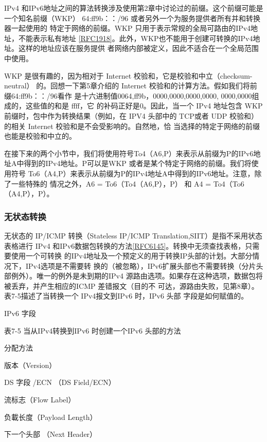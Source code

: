 IPv4 和IPv6地址之间的算法转换涉及使用第2章中讨论过的前缀。这个前缀可能是
一个知名前缀（WKP） 64:ff9b：：/96 或者另外一个为服务提供者所有并和转换器一起使用的
特定于网络的前缀。WKP 只用于表示常规的全局可路由的IPv4地址，不能表示私有地址
\href{https://www.rfc-editor.org/rfc/rfc1918}{[RFC1918]}。此外，WKP也不能用于创建可转换的IPv4地址。这样的地址应该在服务提供
者网络内部被定义，因此不适合在一个全局范围中使用。

WKP 是很有趣的，因为相对于 Internet 校验和，它是校验和中立（checksum-neutral）
的。回想一下第5章介绍的 Internet 校验和的计算方法。假如我们将前缀64:ff9b：：/96看作
是十六进制值0064,ff9b，0000,0000,0000,0000, 0000,0000组成的，这些值的和是 ffff，它
的补码正好是0。因此，当一个 IPv4 地址包含 WKP 前缀时，包中作为转换结果（例如，在
IPV4 头部中的 TCP或者 UDP 校验和）的相关 Internet 校验和是不会受影响的。自然地，恰
当选择的特定于网络的前缀也能是校验和中立的。

在接下来的两个小节中，我们将使用符号To4（A6,P）来表示从前缀为P的IPv6地
址A中得到的IPv4地址。P可以是WKP 或者是某个特定于网络的前缀。我们将使用符号
To6（A4,P）来表示从前缀为P的IPv4地址A中得到的IPv6地址。注意，除了一些特殊的
情况之外，A6 = To6（To4（A6,P），P） 和 A4 = To4（To6（A4,P），P）。

\subsubsection{无状态转换}

无状态的 IP/ICMP 转换（Stateless IP/ICMP Translation,SIIT）是指不采用状态表格进行
IPv4 和IPv6数据包转换的方法\href{https://www.rfc-editor.org/rfc/rfc6145}{[RFC6145]}。转换中无须查找表格，只需要使用一个可转换
的IPv4地址及一个预定义的用于转换IP头部的计划。大部分情况下，IPv4选项是不需要转
换的（被忽略），IPv6扩展头部也不需要转换（分片头部例外）。唯一的例外是未到期的IPv4
源路由选项。如果存在这种选项，数据包将被丢弃，并产生相应的ICMP 差错报文（目的不
可达，源路由失败，见第8章）。表7-5描述了当转换一个 IPv4报文到IPv6 时，IPv6 头部
字段是如何赋值的。

IPv6 字段

表7-5 当从IPv4转换到IPv6 时创建一个IPv6 头部的方法

分配方法

版本（Version）

DS 字段 /ECN （DS Field/ECN）

流标志（Flow Label）

负載长度（Payload Length）

下一个头部 （Next Header）


